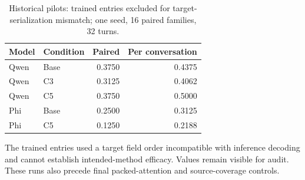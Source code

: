 \begin{table}[ht]\centering
\caption{Historical pilots: trained entries excluded for target-serialization mismatch; one seed, 16 paired families, 32 turns.}
\begin{tabular}{llrr}\toprule Model & Condition & Paired & Per conversation\\\midrule
Qwen & Base & 0.3750 & 0.4375\\
Qwen & C3 & 0.3125 & 0.4062\\
Qwen & C5 & 0.3750 & 0.5000\\
Phi & Base & 0.2500 & 0.3125\\
Phi & C5 & 0.1250 & 0.2188\\
\bottomrule\end{tabular}\end{table}
The trained entries used a target field order incompatible with inference decoding and cannot establish intended-method efficacy. Values remain visible for audit. These runs also precede final packed-attention and source-coverage controls.
